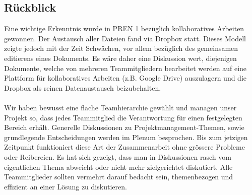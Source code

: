 \subsection{Rückblick}
Eine wichtige Erkenntnis wurde in PREN 1 bezüglich kollaboratives Arbeiten 
gewonnen. Der Austausch aller Dateien fand via Dropbox statt. Dieses Modell zeigte 
jedoch mit der Zeit Schwächen, vor allem bezüglich des gemeinsamen editierens eines 
Dokuments. Es wäre daher eine Diskussion wert, diejenigen Dokumente, welche von mehreren 
Teammitgliedern bearbeitet werden auf eine Plattform für kollaboratives Arbeiten 
(z.B. Google Drive) auszulagern und die Dropbox als reinen Datenaustausch 
beizubehalten.\\
\\
Wir haben bewusst eine flache Teamhierarchie gewählt und managen unser Projekt 
so, dass jedes Teammitglied die Verantwortung für einen festgelegten Bereich 
erhält. Generelle Diskussionen zu Projektmanagement-Themen, sowie grundlegende Entscheidungen werden im Plenum 
besprochen. Bis zum jetzigen 
Zeitpunkt funktioniert diese Art der Zusammenarbeit ohne grössere Probleme oder 
Reibereien. Es hat sich gezeigt, dass man in Diskussionen rasch vom eigentlichen 
Thema abweicht oder nicht mehr zielgerichtet diskutiert. Alle Teammitglieder 
sollten vermehrt darauf bedacht sein, themenbezogen und effizient an einer Lösung 
zu diskutieren.
